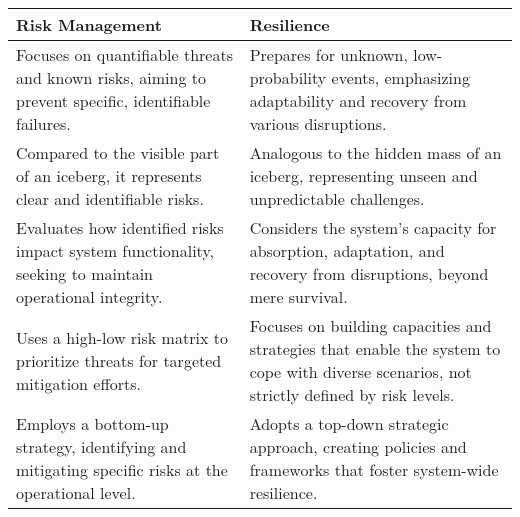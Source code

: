 \begin{tabularx}{\textwidth}{X X}
\toprule
\textbf{Risk Management} & \textbf{Resilience} \\
\midrule
Focuses on quantifiable threats and known risks, aiming to prevent specific, identifiable failures. & Prepares for unknown, low-probability events, emphasizing adaptability and recovery from various disruptions. \\
Compared to the visible part of an iceberg, it represents clear and identifiable risks. & Analogous to the hidden mass of an iceberg, representing unseen and unpredictable challenges. \\
Evaluates how identified risks impact system functionality, seeking to maintain operational integrity. & Considers the system's capacity for absorption, adaptation, and recovery from disruptions, beyond mere survival. \\
Uses a high-low risk matrix to prioritize threats for targeted mitigation efforts. & Focuses on building capacities and strategies that enable the system to cope with diverse scenarios, not strictly defined by risk levels. \\
Employs a bottom-up strategy, identifying and mitigating specific risks at the operational level. & Adopts a top-down strategic approach, creating policies and frameworks that foster system-wide resilience. \\
\bottomrule
\end{tabularx}